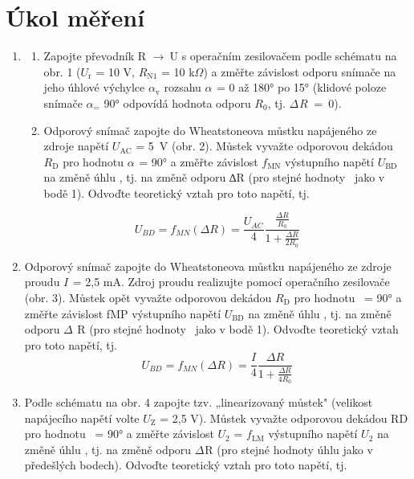 \documentclass[a4paper,12pt]{article}   %
\newcommand{\tohm}{$\Omega$}
\newcommand{\var}[2]{$#1_\text{#2}$}
\newcommand{\rarrow}{$\rightarrow~$}
\begin{document}
\section{Úkol měření}
\label{chap:ukol}
\begin{enumerate}
    \item 
      \begin{enumerate}[label=\alph*)]
        \item  Zapojte převodník R \rarrow U s operačním zesilovačem podle schématu na obr. 1 (\var{U}{r} = 10 V, \var{R}{N1} = 10 k\tohm) a změřte závislost odporu snímače na jeho úhlové      výchylce \var{\alpha} v rozsahu \var{\alpha}{} = 0 až 180° po 15° (klidové poloze snímače \var{\alpha} = 90° odpovídá hodnota odporu \var{R}{0}, tj. \var{\Delta}{}\var{R}{}~=~0).
        \item Odporový snímač zapojte do Wheatstoneova můstku napájeného ze zdroje napětí \var{U}{AC} = 5~V (obr. 2). Můstek vyvažte odporovou dekádou \var{R}{D} pro hodnotu \var{\alpha}{} = 90° a změřte závislost \var{f}{MN} výstupního napětí \var{U}{BD} na změně úhlu \textalpha, tj. na změně odporu ∆R (pro stejné hodnoty \textalpha\ jako v bodě 1). Odvoďte teoretický vztah pro toto napětí, tj.
      \end{enumerate}
      \begin{equation}
        U_{BD} = f_{MN}(\Delta R)=\frac{U_{AC}}{4}\frac{\frac{\Delta R}{R_0}}{1+\frac{\Delta R}{2R_0}}
      \end{equation}
      \item Odporový snímač zapojte do Wheatstoneova můstku napájeného ze zdroje proudu \var{I}{} = 2,5 mA. Zdroj proudu realizujte pomocí operačního zesilovače (obr. 3). Můstek opět vyvažte odporovou dekádou \var{R}{D} pro hodnotu \textalpha\ = 90° a změřte závislost fMP výstupního napětí \var{U}{BD} na změně úhlu \textalpha, tj. na změně odporu \var{\Delta}{} R (pro stejné hodnoty \textalpha\ jako v bodě 1). Odvoďte teoretický vztah pro toto napětí, tj.
      \begin{equation}
        U_{BD} = f_{MN}(\Delta R)=\frac{I}{4}\frac{\Delta R}{1+\frac{\Delta R}{4R_0}}
      \end{equation}
      \item Podle schématu na obr. 4 zapojte tzv. „linearizovaný můstek" (velikost napájecího napětí volte \var{U}{Z} = 2,5 V). Můstek vyvažte odporovou dekádou RD pro hodnotu \textalpha\ = 90° a změřte závislost \var{U}{2} = \var{f}{LM} výstupního napětí \var{U}{2} na změně úhlu \textalpha, tj. na změně odporu \var{\Delta}{}R (pro stejné hodnoty úhlu \textalpha jako v předešlých bodech). Odvoďte teoretický vztah pro toto napětí, tj.

\end{enumerate}
\end{document}
